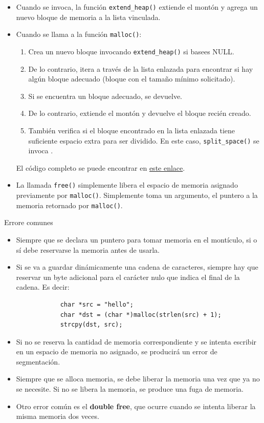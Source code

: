 \documentclass{article}
\begin{document}
\begin{enumerate}
\begin{itemize}
        \item Cuando se invoca, la función \texttt{extend\_heap()} extiende el montón y agrega un nuevo bloque de memoria a la lista vinculada.
        \item Cuando se llama a la función \texttt{malloc()}:
        \begin{enumerate}
            \item Crea un nuevo bloque invocando \texttt{extend\_heap()} si basees NULL.
            \item De lo contrario, itera a través de la lista enlazada para encontrar si hay algún bloque adecuado (bloque con el tamaño mínimo solicitado).
            \item Si se encuentra un bloque adecuado, se devuelve.
            \item De lo contrario, extiende el montón y devuelve el bloque recién creado.
            \item También verifica si el bloque encontrado en la lista enlazada tiene suficiente espacio extra para ser dividido. En este caso, \texttt{split\_space()} se invoca .
        \end{enumerate}
        El código completo se puede encontrar en \href{https://github.com/RAGUL1902/Dynamic-Memory-Allocation-in-C/blob/master/malloc.c}{este enlace}.

        \item La llamada \texttt{free()} simplemente libera el espacio de memoria asignado previamente por \texttt{malloc()}. Simplemente toma un argumento, el puntero a la memoria retornado por \texttt{malloc()}.
    \end{itemize}
\end{enumerate}

\begin{summary}{Errore comunes}
    \begin{itemize}
        \item Siempre que se declara un puntero para tomar memoria en el montículo, si o sí debe reservarse la memoria antes de usarla.
        \item Si se va a guardar dinámicamente una cadena de caracteres, siempre hay que reservar un byte adicional para el carácter nulo que indica el final de la cadena. Es decir:
        \begin{verbatim}
            char *src = "hello";
            char *dst = (char *)malloc(strlen(src) + 1);
            strcpy(dst, src);
        \end{verbatim}
        \item Si no se reserva la cantidad de memoria correspondiente y se intenta escribir en un espacio de memoria no asignado, se producirá un error de segmentación.
        \item Siempre que se alloca memoria, se debe liberar la memoria una vez que ya no se necesite. Si no se libera la memoria, se produce una fuga de memoria.
        \item Otro error común es el \textbf{double free}, que ocurre cuando se intenta liberar la misma memoria dos veces.
    \end{itemize}
\end{summary}
\end{document}
